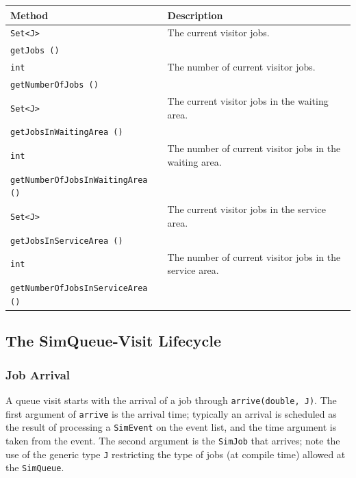 \documentclass[12pt]{book}
\begin{document}
\begin{tabular}{|l|l|}
  \hline
  {\bf Method} & {\bf Description} \\
  \hline
  \lstinline[basicstyle=\footnotesize]!Set<J>!
    & The current visitor jobs.
    \\
  \lstinline[basicstyle=\footnotesize]!getJobs ()!
    &
    \\ \hline
  \lstinline[basicstyle=\footnotesize]!int!
    & The number of current visitor jobs.
    \\
  \lstinline[basicstyle=\footnotesize]!getNumberOfJobs ()!
    &
    \\ \hline
  \lstinline[basicstyle=\footnotesize]!Set<J>!
    & The current visitor jobs in the waiting area.
    \\
  \lstinline[basicstyle=\footnotesize]!getJobsInWaitingArea ()!
    &
    \\ \hline
  \lstinline[basicstyle=\footnotesize]!int!
    & The number of current visitor jobs in the waiting area.
    \\
  \lstinline[basicstyle=\footnotesize]!getNumberOfJobsInWaitingArea ()!
    &
    \\ \hline
  \lstinline[basicstyle=\footnotesize]!Set<J>!
    & The current visitor jobs in the service area.
    \\
  \lstinline[basicstyle=\footnotesize]!getJobsInServiceArea ()!
    &
    \\ \hline
  \lstinline[basicstyle=\footnotesize]!int!
    & The number of current visitor jobs in the service area.
    \\
  \lstinline[basicstyle=\footnotesize]!getNumberOfJobsInServiceArea ()!
    &
    \\ \hline
\end{tabular}

\subsection{The SimQueue-Visit Lifecycle}

\subsubsection{Job Arrival}

A queue visit starts with the arrival of a job
  through \lstinline|arrive(double, J)|.
The first argument of \lstinline|arrive| is the arrival time;
  typically an arrival is scheduled as the result of
  processing a \lstinline|SimEvent| on the event list,
  and the time argument is taken from the event.
The second argument is the \lstinline|SimJob| that arrives;
  note the use of the generic type \lstinline|J|
  restricting the type of jobs (at compile time)
  allowed at the \lstinline|SimQueue|.
\end{document}
